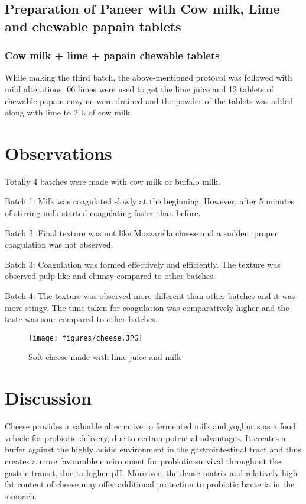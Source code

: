 \documentclass[12pt]{article}
\begin{document}
\subsection{Preparation of  Paneer with Cow milk,  Lime and chewable papain tablets}

\subsubsection{ Cow milk + lime + papain chewable tablets}

While making the third batch, the above-mentioned protocol was followed with mild alterations. 06 limes were used to get the lime juice and 12 tablets of chewable papain enzyme were drained and the powder of the tablets was added along with lime to 2 L of cow milk. 

        \section{Observations}

        Totally 4 batches were made with cow milk or buffalo milk.
        
        Batch 1: Milk was coagulated slowly at the beginning. However, after 5 minutes of stirring milk started coagulating faster than before.


        Batch 2: Final texture was not like Mozzarella cheese and a sudden, proper coagulation was not observed.

        Batch 3: Coagulation was formed effectively and efficiently. The texture was observed pulp like and clumsy compared to other batches.

        Batch 4: The texture was observed more different than other batches and it was more stingy. The time taken for coagulation was comparatively higher and the taste was sour compared to other batches.


        \begin{figure}[ht]
\centering
\texttt{[image: figures/cheese.JPG]}
\caption{Soft cheese made with lime juice and milk}
\label{fig:view}
\end{figure}


        \section{Discussion}

        Cheese provides a valuable alternative to fermented milk and yoghurts as a food vehicle for probiotic delivery, due to certain potential advantages. It creates a buffer against the highly acidic environment in the gastrointestinal tract and thus creates a more favourable environment for probiotic survival throughout the gastric transit, due to higher pH. Moreover, the dense matrix and relatively high-fat content of cheese may offer additional protection to probiotic bacteria in the stomach.
\end{document}
